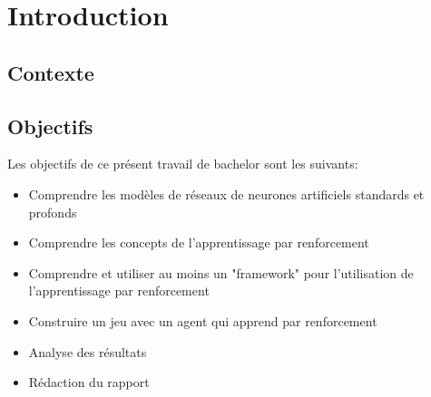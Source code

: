 \documentclass[11pt,a4paper]{report}
\title{\vartitle}
\author{\varauthor}
\date{\vardate}
\begin{document}
  \begin{titlepage}
    \maketitle

    \thispagestyle{empty}

    \begin{abstract}
    // TODO
    \end{abstract}


  \end{titlepage}
  
  \newpage
  
  \tableofcontents
  
  \newpage

  \chapter{Introduction}
  
  \section{Contexte}
  
  \par 
  
  \section{Objectifs}
  
  \par Les objectifs de ce présent travail de bachelor sont les suivants: 
  
  \renewcommand{\labelitemi}{\textbullet}
  \begin{itemize}
  \item Comprendre les modèles de réseaux de neurones artificiels standards et profonds
  \item Comprendre les concepts de l'apprentissage par renforcement
  \item Comprendre et utiliser au moins un "framework" pour l’utilisation de l'apprentissage par renforcement
  \item Construire un jeu avec un agent qui apprend par renforcement
  \item Analyse des résultats 
  \item Rédaction du rapport
  \end{itemize}
  
\end{document}
